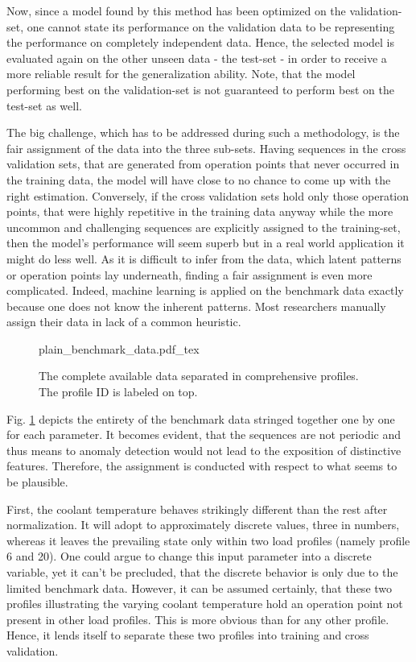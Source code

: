 Now, since a model found by this method has been optimized on the validation-set, one cannot state its performance on the validation data to be representing the performance on completely independent data.
Hence, the selected model is evaluated again on the other unseen data - the test-set - in order to receive a more reliable result for the generalization ability. Note, that the model performing best on the validation-set is not guaranteed to perform best on the test-set as well.

The big challenge, which has to be addressed during such a methodology, is the fair assignment of the data into the three sub-sets.
Having sequences in the cross validation sets, that are generated from operation points that never occurred in the training data, the model will have close to no chance to come up with the right estimation.
Conversely, if the cross validation sets hold only those operation points, that were highly repetitive in the training data anyway while the more uncommon and challenging sequences are explicitly assigned to the training-set, then the model's performance will seem superb but in a real world application it might do less well.
As it is difficult to infer from the data, which latent patterns or operation points lay underneath, finding a fair assignment is even more complicated.
Indeed, machine learning is applied on the benchmark data exactly because one does not know the inherent patterns.
Most researchers manually assign their data in lack of a common heuristic.

\begin{figure}
	\centering
	\def\svgwidth{1\columnwidth}
         {plain_benchmark_data.pdf_tex}
         \caption{The complete available data separated in comprehensive profiles. The profile ID is labeled on top.}
	\label{fig:full_data}
\end{figure}
Fig. \ref{fig:full_data} depicts the entirety of the benchmark data stringed together one by one for each parameter.
It becomes evident, that the sequences are not periodic and thus means to anomaly detection would not lead to the exposition of distinctive features.
Therefore, the assignment is conducted with respect to what seems to be plausible.

First, the coolant temperature behaves strikingly different than the rest after normalization.
It will adopt to approximately discrete values, three in numbers, whereas it leaves the prevailing state only within two load profiles (namely profile 6 and 20).
One could argue to change this input parameter into a discrete variable, yet it can't be precluded, that the discrete behavior is only due to the limited benchmark data.
However, it can be assumed certainly, that these two profiles illustrating the varying coolant temperature hold an operation point not present in other load profiles.
This is more obvious than for any other profile.
Hence, it lends itself to separate these two profiles into training and cross validation.

